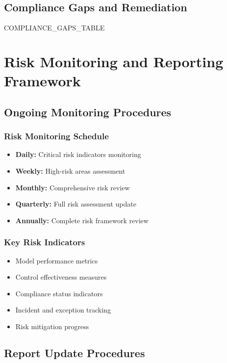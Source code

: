 \documentclass[11pt,a4paper]{article}
\begin{document}
\subsection{Compliance Gaps and Remediation}

{{COMPLIANCE_GAPS_TABLE}}

\newpage

\section{Risk Monitoring and Reporting Framework}

\subsection{Ongoing Monitoring Procedures}

\subsubsection{Risk Monitoring Schedule}
\begin{itemize}
\item \textbf{Daily:} Critical risk indicators monitoring
\item \textbf{Weekly:} High-risk areas assessment
\item \textbf{Monthly:} Comprehensive risk review
\item \textbf{Quarterly:} Full risk assessment update
\item \textbf{Annually:} Complete risk framework review
\end{itemize}

\subsubsection{Key Risk Indicators}
\begin{itemize}
\item Model performance metrics
\item Control effectiveness measures
\item Compliance status indicators
\item Incident and exception tracking
\item Risk mitigation progress
\end{itemize}

\subsection{Report Update Procedures}
\end{document}
